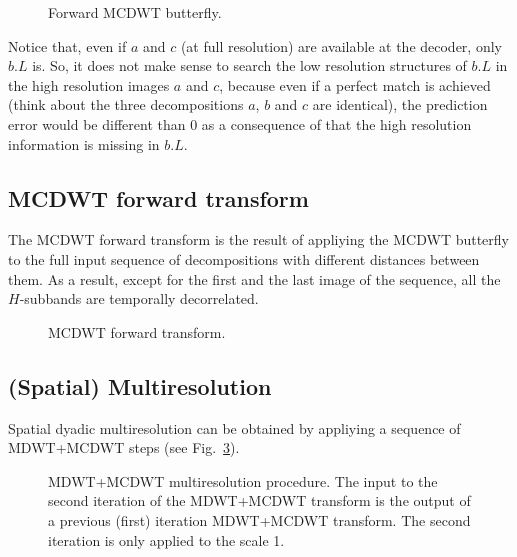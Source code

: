 \begin{figure}
\centering
{}
\caption{Forward MCDWT butterfly.\label{fig:forward_butterfly}}
\end{figure}



Notice that, even if $a$ and $c$ (at full resolution) are available at
the decoder, only $b.L$ is. So, it does not make sense to search the
low resolution structures of $b.L$ in the high resolution images $a$
and $c$, because even if a perfect match is achieved (think about the
three decompositions $a$, $b$ and $c$ are identical), the prediction error
would be different than $0$ as a consequence of that the high
resolution information is missing in $b.L$.

\subsection{MCDWT forward transform}

The MCDWT forward transform is the result of appliying the MCDWT
butterfly to the full input sequence of decompositions with different
distances between them. As a result, except for the first and the last
image of the sequence, all the $H$-subbands are temporally
decorrelated.

\begin{figure}
\centering
{}
\caption{MCDWT forward transform.\label{fig:forward_MCDWT}}
\end{figure}


\subsection{(Spatial) Multiresolution}

Spatial dyadic multiresolution can be obtained by appliying a sequence of MDWT+MCDWT steps (see Fig.~\ref{fig:multiresolution}).

\begin{figure}
\centering
{}
\caption{MDWT+MCDWT multiresolution procedure. The input to the second
  iteration of the MDWT+MCDWT transform is the output of a previous
  (first) iteration MDWT+MCDWT transform. The second iteration is only
  applied to the scale 1.\label{fig:multiresolution}}
\end{figure}


